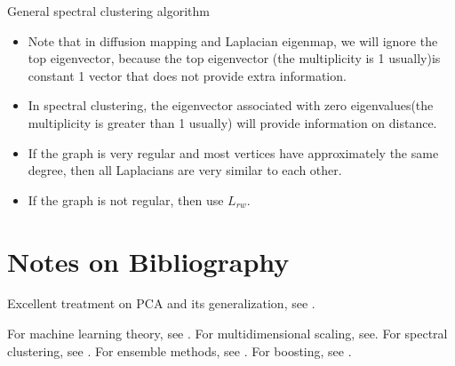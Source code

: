 \begin{refsection}
\begin{algorithm}[H]
	\caption{General spectral clustering algorithm}
\end{algorithm}

\begin{remark}\hfill
\begin{itemize}
	\item Note that in diffusion mapping and Laplacian eigenmap, we will ignore the top eigenvector, because the top eigenvector (the multiplicity is  1 usually)is constant 1 vector that does not provide extra information.
	\item In spectral clustering, the eigenvector associated with zero eigenvalues(the multiplicity is greater than 1 usually) will provide information on distance.
\end{itemize}
\end{remark}



\begin{remark}\hfill
\begin{itemize}
	\item If the graph is very regular and most vertices have approximately the same degree, then all Laplacians are very similar to each other.
	\item If the graph is not regular, then use $L_{rw}$. 
\end{itemize}
\end{remark}






\section{Notes on Bibliography}
Excellent treatment on PCA and its generalization, see \cite{vidal2016generalized}.

For machine learning theory, see \cite{mitchell1997machine}.
For multidimensional scaling, see\cite{borg2005modern}.
For spectral clustering, see \cite{von2007tutorial}.
For ensemble methods, see \cite{zhou2012ensemble}.
For boosting, see \cite{schapire2012boosting}.

\printbibliography
\end{refsection}
